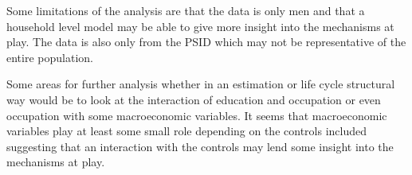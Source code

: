 \documentclass[12pt]{article}
\begin{document}
\begin{onehalfspace}
Some limitations of the analysis are that the data is only men and that a household level model may be able to give more insight into the mechanisms at play. The data is also only from the PSID which may not be representative of the entire population. 

Some areas for further analysis whether in an estimation or life cycle structural way would be to look at the interaction of education and occupation or even occupation with some macroeconomic variables. It seems that macroeconomic variables play at least some small role depending on the controls included suggesting that an interaction with the controls may lend some insight into the mechanisms at play.






\end{onehalfspace}







\vspace{13cm}
\end{document}
